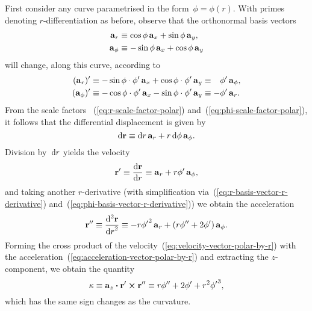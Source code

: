 First consider any curve parametrised in the form~$\phi = \phi (r)$.
With primes denoting $r$-differentiation as before,
observe that the orthonormal basis vectors
\begin{align}
  \mathop{}\!\boldsymbol{\mathbf{a}}_{r} &\equiv \cos\phi \mathop{}\!\boldsymbol{\mathbf{a}}_{x} + \sin\phi \mathop{}\!\boldsymbol{\mathbf{a}}_{y},
    \label{eq:r-basis-vector} \\
  \mathop{}\!\boldsymbol{\mathbf{a}}_{\phi} &\equiv -\sin\phi \mathop{}\!\boldsymbol{\mathbf{a}}_{x} + \cos\phi \mathop{}\!\boldsymbol{\mathbf{a}}_{y}
    \label{eq:phi-basis-vector}
\end{align}
will change, along this curve, according to
\begin{align}
  (\basisvec{r})'
  &\ideq -\sin\phi \cdot \phi' \basisvec{x} + \cos\phi \cdot \phi' \basisvec{y}
  \ideq \+\phi' \basisvec{\phi},
    \label{eq:r-basis-vector-r-derivative} \\
  (\basisvec{\phi})'
  &\ideq -\cos\phi \cdot \phi' \basisvec{x} - \sin\phi \cdot \phi' \basisvec{y}
  \ideq -\phi' \basisvec{r}.
    \label{eq:phi-basis-vector-r-derivative}
\end{align}
From the scale factors~%
  (\ref{eq:r-scale-factor-polar}) and~(\ref{eq:phi-scale-factor-polar}),
it follows that the differential displacement is given by
\begin{equation}
  \mathop{}\!\mathrm{d}\boldsymbol{\mathbf{r}} \equiv \mathop{}\!\mathrm{d} r \mathop{}\!\boldsymbol{\mathbf{a}}_{r} + r \mathop{}\!\mathrm{d}\phi \mathop{}\!\boldsymbol{\mathbf{a}}_{\phi}.
  \label{eq:differential-displacement-polar}
\end{equation}
Division by~$\mathop{}\!\mathrm{d} r$ yields the velocity
\begin{equation}
  \vec{r}' \ideq \tder{\vec{r}}{r} \ideq
  \basisvec{r} + r \phi' \basisvec{\phi},
  \label{eq:velocity-vector-polar-by-r}
\end{equation}
and taking another $r$-derivative
(with simplification via~(\ref{eq:r-basis-vector-r-derivative})
and~(\ref{eq:phi-basis-vector-r-derivative}))
we obtain the acceleration
\begin{equation}
  \vec{r}'' \ideq \tder[2]{\vec{r}}{r} \ideq
  -r {\phi'}^2 \basisvec{r}
    +
  \roundbr*{r \phi'' + 2 \phi'} \basisvec{\phi}.
  \label{eq:acceleration-vector-polar-by-r}
\end{equation}
Forming the cross product of
the velocity~(\ref{eq:velocity-vector-polar-by-r})
with the acceleration~(\ref{eq:acceleration-vector-polar-by-r})
and extracting the $z$-component,
we obtain the quantity
\begin{equation}
  \kappa \equiv
  \mathop{}\!\boldsymbol{\mathbf{a}}_{z} \boldsymbol{\cdot} \boldsymbol{\mathbf{r}}' \boldsymbol{\times} \boldsymbol{\mathbf{r}}'' \equiv
  r \phi'' + 2 \phi' + r^2 {\phi'}^3,
  \label{eq:kappa-polar-by-r}
\end{equation}
which has the same sign changes as the curvature.


